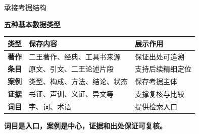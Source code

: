\documentclass[aspectratio=169]{beamer}
\newcommand{\key}[1]{\textcolor{rucRed}{\textbf{#1}}}
\begin{document}
\begin{frame}{承接考据结构}
    \begin{center}
        \small\textbf{五种基本数据类型}
    \end{center}
    \vspace{-0.18cm}
    \begin{table}[h]
        \centering
        \small
        \begin{tabularx}{\textwidth}{>{\bfseries}l X X}
            \toprule
            类型 & 保存内容 & 展示作用 \\
            \midrule
            著作 & 二王著作、经典、工具书来源 & 保证出处可追溯 \\
            条目 & 原文、引文、二王论述片段 & 支持后续精细定位 \\
            案例 & 类型、构成、方法、结论、状态 & 保存考据主体 \\
            证据 & 书证、声训、义证、异文等 & 支撑复核与比较 \\
            词目 & 字、词、术语 & 提供检索入口 \\
            \bottomrule
        \end{tabularx}
    \end{table}
    \begin{center}
        \key{词目是入口，案例是中心，证据和出处保证可复核。}
    \end{center}
\end{frame}
\end{document}
